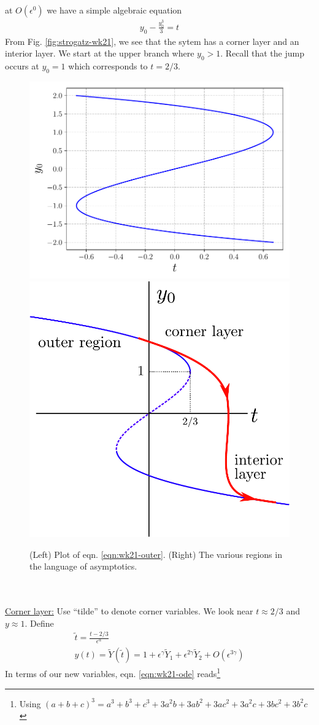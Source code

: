 at $O(\epsilon^0)$ we have a simple algebraic equation
\begin{gather}
	y_0 - \frac{y_0^3}{3} = t \label{eqn:wk21-outer}
\end{gather}
From Fig. \ref{fig:strogatz-wk21}, we see that the sytem has a corner layer and an interior layer. We start at the upper branch where $y_0 >1$. Recall that the jump occurs at $y_0=1$ which corresponds to $t=2/3$.
\begin{figure}[!h]
	\centering
	\includegraphics[height=0.4\textwidth]{./plots/pdf/strogatz-wk21-layers.pdf}
	\includegraphics[height=0.4\textwidth]{./plots/pdf/delayed-bifurcation-layers.pdf}
	\caption{(Left) Plot of eqn. \ref{eqn:wk21-outer}. (Right) The various regions in the language of asymptotics.}
	\label{fig:delayed-bifurcation-layers}
\end{figure} \\\\
\underline{Corner layer:} Use ``tilde'' to denote corner variables. We look near $t \approx 2/3$ and $y \approx 1$. Define 
\begin{equation}\label{eqn:wk21-corner-sub}
\begin{gathered}
\tilde{t} = \frac{t-2/3}{\epsilon^\alpha} \\ y(t) = \tilde{Y}(\tilde{t}) = 1 + \epsilon^\gamma \tilde{Y}_1 + \epsilon^{2\gamma} \tilde{Y}_2 + O(\epsilon^{3\gamma})
\end{gathered} 
\end{equation}
In terms of our new variables, eqn. \ref{eqn:wk21-ode} reads\footnote{Using $(a+b+c)^3 = a^3 + b^3 + c^3 + 3a^2b + 3 ab^2 + 3ac^2 + 3a^2c + 3bc^2 + 3b^2c$}
